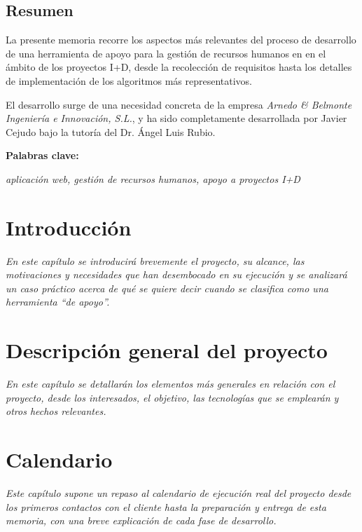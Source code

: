 \documentclass[a4paper,12pt]{book}
\begin{document}


\thispagestyle{empty}
\section*{Resumen}

La presente memoria recorre los aspectos más relevantes del proceso de
desarrollo de una herramienta de apoyo para la gestión de recursos humanos en
en el ámbito de los proyectos I+D, desde la recolección de requisitos hasta
los detalles de implementación de los algoritmos más representativos.

El desarrollo surge de una necesidad concreta de la empresa \textit{Arnedo \&
Belmonte Ingeniería e Innovación, S.L.}, y ha sido completamente desarrollada
por Javier Cejudo bajo la tutoría del Dr. Ángel Luis Rubio.

\quad

\textbf{Palabras clave:}

\textit{aplicación web, gestión de recursos humanos, apoyo a proyectos I+D}

\setcounter{tocdepth}{2}

\tableofcontents

\newpage\listoffigures
\label{ind:figuras}

\newpage\listoftables
\label{ind:cuadros}

\chapter{Introducción}
\label{chp:introduccion}
\thispagestyle{empty}
\noindent \textit{En este capítulo se introducirá brevemente el proyecto, su
alcance, las motivaciones y necesidades que han desembocado en su ejecución y se
analizará un caso práctico acerca de qué se quiere decir cuando se clasifica
como una herramienta ``de apoyo''.}


\chapter{Descripción general del proyecto}
\label{chp:descripcion}
\thispagestyle{empty}
\noindent \textit{En este capítulo se detallarán los elementos más generales
en relación con el proyecto, desde los interesados, el objetivo, las
tecnologías que se emplearán y otros hechos relevantes.}


\chapter{Calendario}
\label{chp:calendario}
\thispagestyle{empty}
\noindent \textit{Este capítulo supone un repaso al calendario de ejecución
real del proyecto desde los primeros contactos con el cliente hasta la
preparación y entrega de esta memoria, con una breve explicación de cada fase
de desarrollo.}

\end{document}
